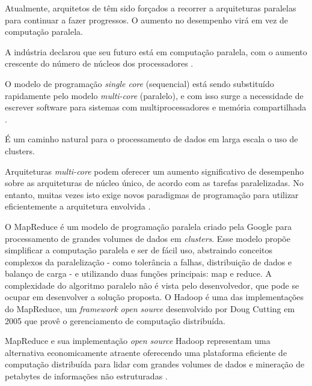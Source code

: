 
Atualmente, arquitetos de têm sido forçados a recorrer a arquiteturas paralelas para continuar a fazer progressos. O aumento no desempenho virá em vez de computação paralela.
\cite{Manferdelli:2008}
  
A indústria declarou que seu futuro está em computação paralela, com o aumento crescente do número de núcleos dos processadores \cite{Asanovic:2009}.

O modelo de programação \textit{single core} (sequencial) está sendo substituído rapidamente pelo modelo \textit{multi-core} (paralelo), e com isso surge a necessidade de escrever software para sistemas com multiprocessadores e memória compartilhada \cite{Ernst:2009}.

É um caminho natural para o processamento de dados em larga escala o uso de clusters.


Arquiteturas \textit{multi-core} podem oferecer um aumento significativo de desempenho sobre as arquiteturas de núcleo único, de acordo com as tarefas paralelizadas. No entanto, muitas vezes isto exige novos paradigmas de programação para utilizar eficientemente a arquitetura envolvida \cite{Prinslow:2011}. 


O MapReduce\cite{Dean:2008}  é um modelo de programação paralela criado pela Google para processamento de grandes volumes de dados em \textit{clusters}. Esse modelo propõe simplificar a computação paralela e ser de fácil uso, abstraindo conceitos complexos da paralelização - como tolerância a falhas, distribuição de dados e balanço de carga - e utilizando duas funções principais: map e reduce. A complexidade do algoritmo paralelo não é vista pelo desenvolvedor, que pode se ocupar em desenvolver a solução proposta. O Hadoop \cite{Hadoop:2010} é uma das implementações do MapReduce, um \textit{framework open source } desenvolvido por Doug Cutting em 2005 que provê o gerenciamento de computação distribuída.

MapReduce e sua implementação \textit{open source} Hadoop representam uma alternativa economicamente atraente oferecendo uma plataforma eficiente de computação distribuída para lidar com grandes volumes de dados e mineração de petabytes de informações não estruturadas \cite{Cherkasova:2011}.


